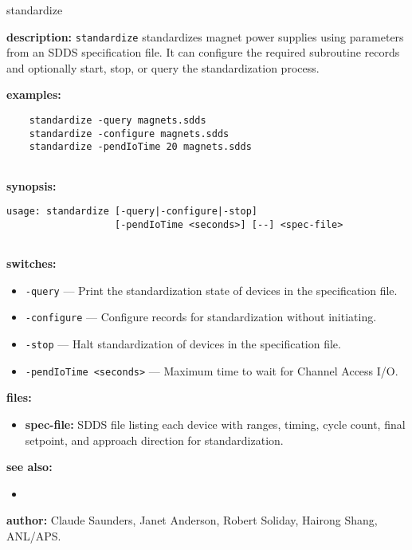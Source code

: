 \begin{sddsprog}{standardize}
\item \textbf{description:}
\verb+standardize+ standardizes magnet power supplies using parameters from an SDDS specification file.
It can configure the required subroutine records and optionally start, stop, or query the standardization process.

\item \textbf{examples:}
  \begin{verbatim}
    standardize -query magnets.sdds
    standardize -configure magnets.sdds
    standardize -pendIoTime 20 magnets.sdds
  
\end{verbatim}

\item \textbf{synopsis:}
  \begin{verbatim}
usage: standardize [-query|-configure|-stop]
                   [-pendIoTime <seconds>] [--] <spec-file>
  
\end{verbatim}

\item \textbf{switches:}
\begin{itemize}
  \item {\tt -query} --- Print the standardization state of devices in the specification file.
  \item {\tt -configure} --- Configure records for standardization without initiating.
  \item {\tt -stop} --- Halt standardization of devices in the specification file.
  \item {\tt -pendIoTime <seconds>} --- Maximum time to wait for Channel Access I/O.
\end{itemize}

\item \textbf{files:}
\begin{itemize}
  \item \textbf{spec-file:} SDDS file listing each device with ranges, timing, cycle count, final setpoint, and approach direction for standardization.
\end{itemize}

\item \textbf{see also:}
\begin{itemize}
  \item {}
\end{itemize}

\item \textbf{author:} Claude Saunders, Janet Anderson, Robert Soliday, Hairong Shang, ANL/APS.
\end{sddsprog}

